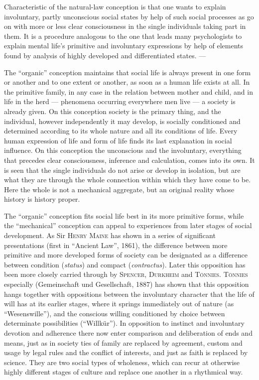 \documentclass[12pt]{book}
\newcommand{\opage}[1]{\marginnote{\footnotesize\textit{[#1]}}}
\begin{document}
Characteristic of the natural-law conception is that one wants to explain in\-vol\-un\-tary,
partly unconscious social states by help of such social processes as go on with more or
less clear consciousness in the single individuals taking part in them. It is a procedure
analogous to the one that leads many psychologists \opage{61}to explain mental life's primitive and
involuntary expressions by help of elements found by analysis of highly developed and
differentiated states. ---

The ``organic'' conception maintains that social life is always present in one form or
another and to one extent or another, as soon as a human life exists at all. In the
primitive family, in any case in the relation between mother and child, and in life in
the herd --- phenomena occurring everywhere men live --- a society is already given. On
this conception society is the primary thing, and the individual, however independently
it may develop, is socially conditioned and determined according to its whole nature and
all its conditions of life. Every human expression of life and form of life finds its
last explanation in social influence. On this conception the unconscious and the
involuntary, everything that precedes clear consciousness, inference and calculation,
comes into its own. It is seen that the single individuals do not arise or develop in
isolation, but are what they are through the whole connection within which they have come
to be. Here the whole is not a mechanical aggregate, but an original reality whose history
is history proper.

The ``organic'' conception fits social life best in its more primitive forms, while the
``mechanical'' conception can appeal to experiences from later stages of social
development. As Sir \textsc{Henry Maine} has shown in a series of significant
presentations (first in ``Ancient Law'', 1861), the difference between more primitive and
more developed forms of society can be designated as a difference between condition
(\textit{status}) and compact (\textit{contractus}). Later this opposition has been more
closely carried through by \textsc{Spencer}, \textsc{Durkheim} and \textsc{Tönnies}.
\textsc{Tönnies} especially (Gemeinschaft und Gesellschaft, 1887) has shown that this
opposition hangs together with oppositions between the involuntary character that the life
of will has at its earlier stages, where it springs immediately out of nature (as
``Wesenswille''), and the conscious willing conditioned by choice between determinate
possibilities (``Willkür''). In opposition to instinct and involuntary devotion and
adherence there now enter comparison and deliberation of ends and means, just as in
society ties of family are replaced by agreement, custom and usage by legal rules and the
conflict of interests, and just as faith is replaced by science. They are two social types
of wholeness, which can recur at otherwise highly different stages of culture and replace
one another in a rhythmical way.
\end{document}
